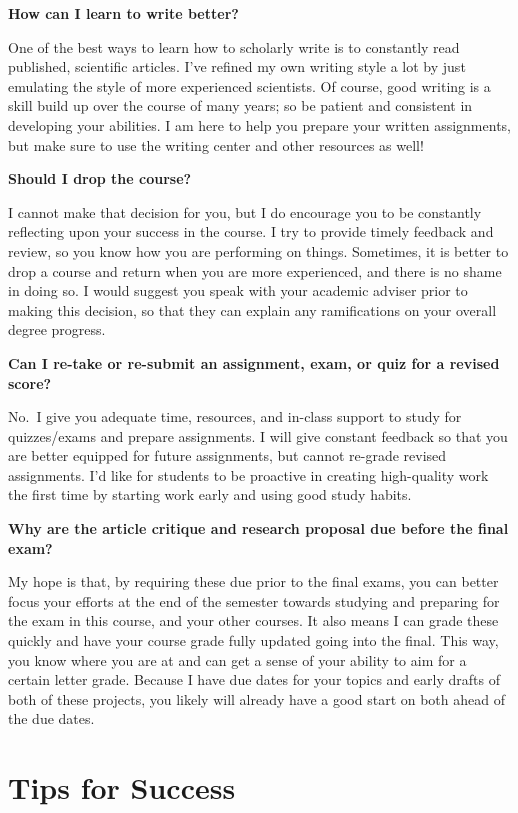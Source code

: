 \documentclass[
  12pt,
  letterpaper,
]{scrartcl}
\begin{document}
\textbf{How can I learn to write better?}

One of the best ways to learn how to scholarly write is to constantly
read published, scientific articles. I've refined my own writing style a
lot by just emulating the style of more experienced scientists. Of
course, good writing is a skill build up over the course of many years;
so be patient and consistent in developing your abilities. I am here to
help you prepare your written assignments, but make sure to use the
writing center and other resources as well!

\textbf{Should I drop the course?}

I cannot make that decision for you, but I do encourage you to be
constantly reflecting upon your success in the course. I try to provide
timely feedback and review, so you know how you are performing on
things. Sometimes, it is better to drop a course and return when you are
more experienced, and there is no shame in doing so. I would suggest you
speak with your academic adviser prior to making this decision, so that
they can explain any ramifications on your overall degree progress.

\textbf{Can I re-take or re-submit an assignment, exam, or quiz for a
revised score?}

No.~I give you adequate time, resources, and in-class support to study
for quizzes/exams and prepare assignments. I will give constant feedback
so that you are better equipped for future assignments, but cannot
re-grade revised assignments. I'd like for students to be proactive in
creating high-quality work the first time by starting work early and
using good study habits.

\textbf{Why are the article critique and research proposal due before
the final exam?}

My hope is that, by requiring these due prior to the final exams, you
can better focus your efforts at the end of the semester towards
studying and preparing for the exam in this course, and your other
courses. It also means I can grade these quickly and have your course
grade fully updated going into the final. This way, you know where you
are at and can get a sense of your ability to aim for a certain letter
grade. Because I have due dates for your topics and early drafts of both
of these projects, you likely will already have a good start on both
ahead of the due dates.

\section{Tips for Success}\label{tips-for-success}
\end{document}
